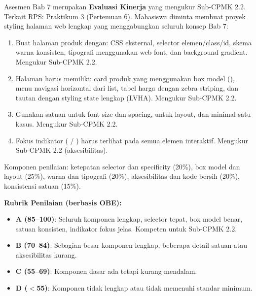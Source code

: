 \documentclass[../main.tex]{subfiles}
\begin{document}
\begin{asesmen}
Asesmen Bab 7 merupakan \textbf{Evaluasi Kinerja} yang mengukur Sub-CPMK 2.2. Terkait RPS: Praktikum 3 (Pertemuan 6). Mahasiswa diminta membuat proyek styling halaman web lengkap yang menggabungkan seluruh konsep Bab 7:
\begin{enumerate}
  \item Buat halaman produk dengan: CSS eksternal, selector elemen/class/id, skema warna konsisten, tipografi menggunakan web font, dan background gradient. Mengukur Sub-CPMK 2.2.
  \item Halaman harus memiliki: card produk yang menggunakan box model (), menu navigasi horizontal dari list, tabel harga dengan zebra striping, dan tautan dengan styling state lengkap (LVHA). Mengukur Sub-CPMK 2.2.
  \item Gunakan satuan  untuk font-size dan spacing, \code{\%} untuk layout, dan  minimal satu kasus. Mengukur Sub-CPMK 2.2.
  \item Fokus indikator ( / ) harus terlihat pada semua elemen interaktif. Mengukur Sub-CPMK 2.2 (aksesibilitas).
\end{enumerate}

Komponen penilaian: ketepatan selector dan specificity (20\%), box model dan layout (25\%), warna dan tipografi (20\%), aksesibilitas dan kode bersih (20\%), konsistensi satuan (15\%).

\textbf{Rubrik Penilaian (berbasis OBE):}
\begin{itemize}
  \item \textbf{A (85--100)}: Seluruh komponen lengkap, selector tepat, box model benar, satuan konsisten, indikator fokus jelas. Kompeten untuk Sub-CPMK 2.2.
  \item \textbf{B (70--84)}: Sebagian besar komponen lengkap, beberapa detail satuan atau aksesibilitas kurang.
  \item \textbf{C (55--69)}: Komponen dasar ada tetapi kurang mendalam.
  \item \textbf{D ($<$55)}: Komponen tidak lengkap atau tidak memenuhi standar minimum.
\end{itemize}
\end{asesmen}
\end{document}
